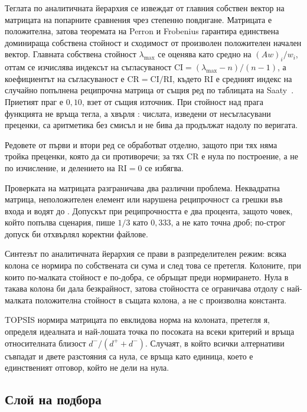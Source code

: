 Теглата по аналитичната йерархия се извеждат от главния собствен вектор на
матрицата на попарните сравнения чрез степенно повдигане. Матрицата е положителна,
затова теоремата на Perron и Frobenius гарантира единствена доминираща собствена
стойност и сходимост от произволен положителен начален вектор. Главната собствена
стойност $\lambda_{\max}$ се оценява като средно на $(Aw)_i / w_i$, оттам се
изчислява индексът на съгласуваност
$\mathrm{CI} = (\lambda_{\max} - n)/(n-1)$, а коефициентът на съгласуваност е
$\mathrm{CR} = \mathrm{CI}/\mathrm{RI}$, където $\mathrm{RI}$ е средният индекс на
случайно попълнена реципрочна матрица от същия ред по таблицата на
Saaty~\cite{saaty1980ahp}. Приетият праг е $0{,}10$, взет от същия източник. При
стойност над прага функцията  не връща тегла, а хвърля
: числата, изведени от несъгласувани преценки, са
аритметика без смисъл и не бива да продължат надолу по веригата.

Редовете от първи и втори ред се обработват отделно, защото при тях няма тройка
преценки, която да си противоречи; за тях $\mathrm{CR}$ е нула по построение, а не
по изчисление, и делението на $\mathrm{RI} = 0$ се избягва.

Проверката на матрицата разграничава два различни проблема. Неквадратна матрица,
неположителен елемент или нарушена реципрочност са грешки във входа и водят до
. Допускът при реципрочността е два процента, защото човек, който
попълва сценария, пише $1/3$ като $0{,}333$, а не като точна дроб; по-строг
допуск би отхвърлял коректни файлове.

Синтезът по аналитичната йерархия се прави в разпределителен режим: всяка колона
се нормира по собствената си сума и след това се претегля. Колоните, при които
по-малката стойност е по-добра, се обръщат преди нормирането. Нула в такава
колона би дала безкрайност, затова стойността се ограничава отдолу с най-малката
положителна стойност в същата колона, а не с произволна константа.

TOPSIS нормира матрицата по евклидова норма на колоната, претегля я, определя
идеалната и най-лошата точка по посоката на всеки критерий и връща относителната
близост $d^-/(d^+ + d^-)$. Случаят, в който всички алтернативи съвпадат и двете
разстояния са нула, се връща като единица, което е единственият отговор, който не
дели на нула.

\subsection{Слой на подбора}

